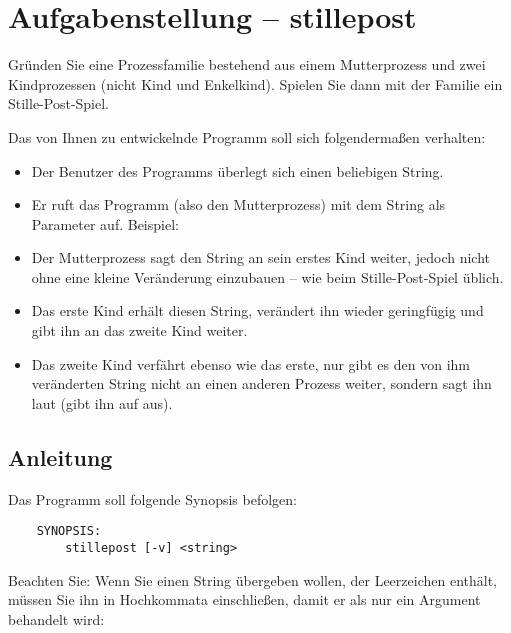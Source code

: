 




\section*{Aufgabenstellung -- stillepost}

Gründen Sie eine Prozessfamilie bestehend aus einem Mutterprozess und
zwei Kindprozessen (nicht Kind und Enkelkind). Spielen Sie dann mit
der Familie ein Stille-Post-Spiel.

Das von Ihnen zu entwickelnde Programm  soll sich
folgendermaßen verhalten:

\begin{itemize}
\item Der Benutzer des Programms überlegt sich einen beliebigen
String.
\item Er ruft das Programm (also den Mutterprozess) mit dem String als
Parameter auf. Beispiel: 
\item Der Mutterprozess sagt den String an sein erstes Kind weiter,
jedoch nicht ohne eine kleine Veränderung einzubauen -- wie beim
Stille-Post-Spiel üblich.
\item Das erste Kind erhält diesen String, verändert ihn wieder
geringfügig und gibt ihn an das zweite Kind weiter.
\item Das zweite Kind verfährt ebenso wie das erste, nur gibt es den
von ihm veränderten String nicht an einen anderen Prozess weiter,
sondern sagt ihn laut (gibt ihn auf  aus).
\end{itemize}

\subsection*{Anleitung}

Das Programm soll folgende Synopsis befolgen:
\begin{verbatim}
    SYNOPSIS:
        stillepost [-v] <string>
\end{verbatim}

Beachten Sie: Wenn Sie einen String übergeben wollen, der Leerzeichen
enthält, müssen Sie ihn in Hochkommata einschließen, damit er als
nur ein Argument behandelt wird: 

